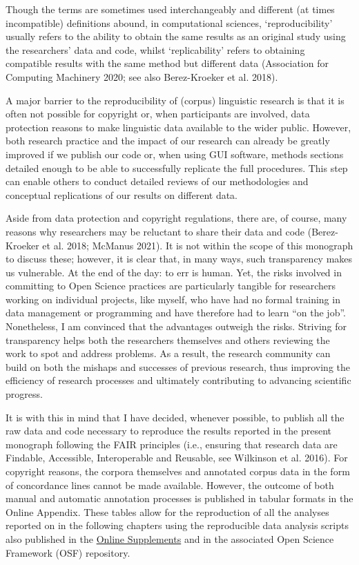 \documentclass[
  letterpaper,
  DIV=11,
  numbers=noendperiod]{scrreprt}
\begin{document}
Though the terms are sometimes used interchangeably and different (at
times incompatible) definitions abound, in computational sciences,
`reproducibility' usually refers to the ability to obtain the same
results as an original study using the researchers' data and code,
whilst `replicability' refers to obtaining compatible results with the
same method but different data (Association for Computing Machinery
2020; see also Berez-Kroeker et al. 2018).

A major barrier to the reproducibility of (corpus) linguistic research
is that it is often not possible for copyright or, when participants are
involved, data protection reasons to make linguistic data available to
the wider public. However, both research practice and the impact of our
research can already be greatly improved if we publish our code or, when
using GUI software, methods sections detailed enough to be able to
successfully replicate the full procedures. This step can enable others
to conduct detailed reviews of our methodologies and conceptual
replications of our results on different data.

Aside from data protection and copyright regulations, there are, of
course, many reasons why researchers may be reluctant to share their
data and code (Berez-Kroeker et al. 2018; McManus 2021). It is not
within the scope of this monograph to discuss these; however, it is
clear that, in many ways, such transparency makes us vulnerable. At the
end of the day: to err is human. Yet, the risks involved in committing
to Open Science practices are particularly tangible for researchers
working on individual projects, like myself, who have had no formal
training in data management or programming and have therefore had to
learn ``on the job''. Nonetheless, I am convinced that the advantages
outweigh the risks. Striving for transparency helps both the researchers
themselves and others reviewing the work to spot and address problems.
As a result, the research community can build on both the mishaps and
successes of previous research, thus improving the efficiency of
research processes and ultimately contributing to advancing scientific
progress.

It is with this in mind that I have decided, whenever possible, to
publish all the raw data and code necessary to reproduce the results
reported in the present monograph following the FAIR principles (i.e.,
ensuring that research data are Findable, Accessible, Interoperable and
Reusable, see Wilkinson et al. 2016). For copyright reasons, the corpora
themselves and annotated corpus data in the form of concordance lines
cannot be made available. However, the outcome of both manual and
automatic annotation processes is published in tabular formats in the
Online Appendix. These tables allow for the reproduction of all the
analyses reported on in the following chapters using the reproducible
data analysis scripts also published in the
\href{https://elenlefoll.github.io/TextbookMDA}{Online Supplements} and
in the associated Open Science Framework (OSF) repository.
\end{document}
